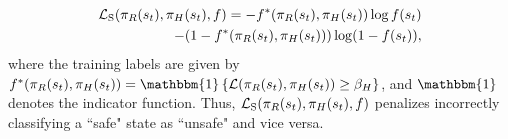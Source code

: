 \begin{align}
\label{eq:safe-loss}
    \begin{split}
    \mathcal{L}_{\rm S}(\pi_{R}(s_t),\pi_{H}(s_t), f) 
    = -f^*(\pi_{R}(s_t),\pi_{H}(s_t))\log f(s_t) \\
    -(1 - f^*(\pi_{R}(s_t), \pi_{H}(s_t)))\log (1 - f(s_t) ),
    \end{split}
\end{align}
where the training labels are given by $\fstarfilt(\pirob(s_t),\pisup(s_t)) = \mathbbm{1}\left\{\mathcal{L}(\pirob(s_t), \pisup(s_t)) \geq  \tausup\right\}$, and $\mathbbm{1}$ denotes the indicator function.
Thus, $\mathcal{L}_{\rm S}(\pi_{R}(s_t),\pi_{H}(s_t),f)$ penalizes incorrectly classifying a ``safe" state as ``unsafe" and vice versa. %

